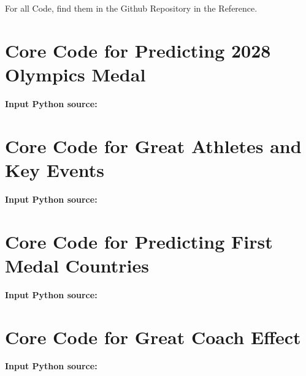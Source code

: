 \begin{appendices}

        For all Code, find them in the Github Repository in the Reference.\cite{0}

    \section{Core Code for Predicting 2028 Olympics Medal}

    \textbf{\textcolor[rgb]{0.98,0.00,0.00}{Input Python source:}}
    

    \section{Core Code for Great Athletes and Key Events}
    \textbf{\textcolor[rgb]{0.98,0.00,0.00}{Input Python source:}}
    


    \section{Core Code for Predicting First Medal Countries}
    
    \textbf{\textcolor[rgb]{0.98,0.00,0.00}{Input Python source:}}
    


    \section{Core Code for Great Coach Effect}

    \textbf{\textcolor[rgb]{0.98,0.00,0.00}{Input Python source:}}
    

    
\end{appendices}
    